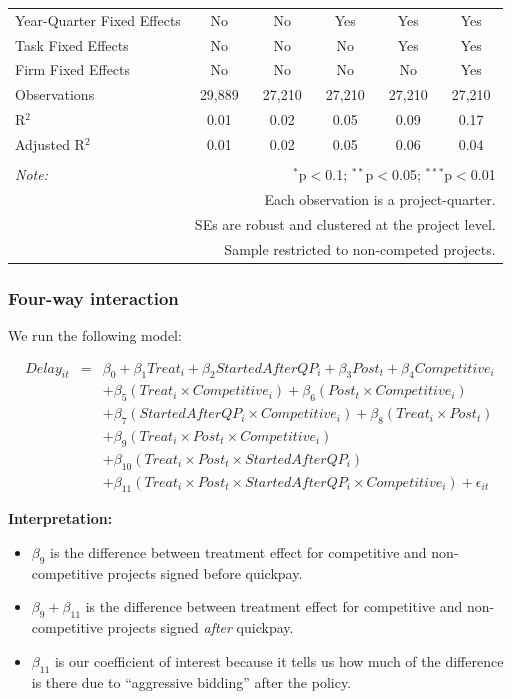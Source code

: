 \documentclass[
]{article}
\providecommand{\tightlist}{%
  \setlength{\itemsep}{0pt}\setlength{\parskip}{0pt}}
\begin{document}
\begin{table}[H]
\begin{tabular}{@{\extracolsep{-2pt}}lccccc}
Year-Quarter Fixed Effects & No & No & Yes & Yes & Yes \\ 
Task Fixed Effects & No & No & No & Yes & Yes \\ 
Firm Fixed Effects & No & No & No & No & Yes \\ 
Observations & 29,889 & 27,210 & 27,210 & 27,210 & 27,210 \\ 
R$^{2}$ & 0.01 & 0.02 & 0.05 & 0.09 & 0.17 \\ 
Adjusted R$^{2}$ & 0.01 & 0.02 & 0.05 & 0.06 & 0.04 \\ 
\hline 
\hline \\[-1.8ex] 
\textit{Note:}  & \multicolumn{5}{r}{$^{*}$p$<$0.1; $^{**}$p$<$0.05; $^{***}$p$<$0.01} \\ 
 & \multicolumn{5}{r}{Each observation is a project-quarter.} \\ 
 & \multicolumn{5}{r}{SEs are robust and clustered at the project level.} \\ 
 & \multicolumn{5}{r}{Sample restricted to non-competed projects.} \\ 
\end{tabular} 
\end{table}

\hypertarget{four-way-interaction}{%
\subsubsection{Four-way interaction}\label{four-way-interaction}}

We run the following model:

\[\begin{aligned} Delay_{it} &=& \beta_0 +\beta_1 Treat_i+ \beta_2 StartedAfterQP_i+ \beta_3 Post_t+ \beta_4 Competitive_i\\ && +  \beta_5 (Treat_i \times Competitive_i) + \beta_6 (Post_t \times Competitive_i)\\ && +  \beta_7 (StartedAfterQP_i \times Competitive_i) +\beta_8 (Treat_i \times Post_t)\\ && + \beta_9 (Treat_i \times Post_t \times Competitive_i) \\ && + \beta_{10} (Treat_i \times Post_t \times StartedAfterQP_i )\\ && + \beta_{11} (Treat_i \times Post_t \times StartedAfterQP_i \times Competitive_i) + \epsilon_{it} \end{aligned}\]

\textbf{Interpretation:}

\begin{itemize}
\tightlist
\item
  \(\beta_9\) is the difference between treatment effect for competitive
  and non-competitive projects signed before quickpay.
\item
  \(\beta_9 + \beta_{11}\) is the difference between treatment effect
  for competitive and non-competitive projects signed \emph{after}
  quickpay.
\item
  \(\beta_{11}\) is our coefficient of interest because it tells us how
  much of the difference is there due to ``aggressive bidding'' after
  the policy.
\end{itemize}
\end{document}
